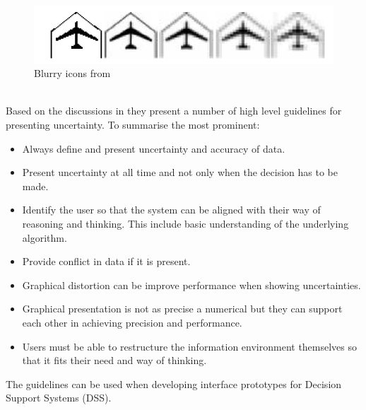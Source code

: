 \begin{figure}[h!]
\centering
\includegraphics[width=0.7\linewidth,natwidth=898,natheight=587]{billeder/blurryIcons.png}
\caption{Blurry icons from \cite{UncertainInformation}}
\label{fig:blurryIcons}
\end{figure}  
\\[0.5cm]
Based on the discussions in \cite{UncertainInformation} they present a number of high level guidelines for presenting uncertainty. To summarise the most prominent:
\begin{itemize}
\item Always define and present uncertainty and accuracy of data.
\item Present uncertainty at all time and not only when the decision has to be made.
\item Identify the user so that the system can be aligned with their way of reasoning and thinking. This include basic understanding of the underlying algorithm.
\item Provide conflict in data if it is present.
\item Graphical distortion can be improve performance when showing uncertainties.
\item Graphical presentation is not as precise a numerical but they can support each other in achieving precision and performance.
\item Users must be able to restructure the information environment themselves so that it fits their need and way of thinking.
\end{itemize}
The guidelines can be used when developing interface prototypes for Decision Support Systems (DSS).